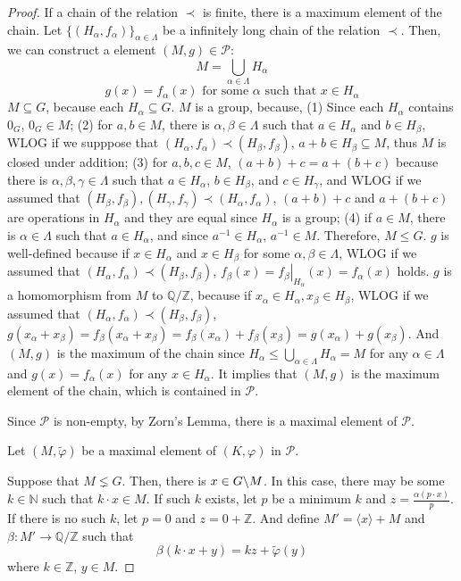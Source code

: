 \documentclass{article}
\newcommand{\bs}{\char`\\}
\newcommand{\bbN}{\mathbb{N}}
\newcommand{\bbQ}{\mathbb{Q}}
\newcommand{\bbZ}{\mathbb{Z}}
\newcommand{\calP}{\mathcal{P}}
\begin{document}
\begin{proof}
If a chain of the relation \(\prec\) is finite, there is a maximum element of the chain.
Let \(\{(H_\alpha, f_\alpha)\}_{\alpha \in \Lambda}\) be a infinitely long chain of the relation \(\prec\).
Then, we can construct a element \((M, g) \in \calP\):
\[M = \bigcup_{\alpha \in \Lambda} H_\alpha\]
\[g(x) = f_\alpha(x) \text{ for some } \alpha \text { such that } x \in H_\alpha\]
\(M \subseteq G\), because each \(H_\alpha \subseteq G\).
\(M\) is a group, because, (1) Since each \(H_\alpha\) contains \(0_G\), \(0_G \in M\); (2) for \(a, b \in M\), there is \(\alpha, \beta \in \Lambda\) such that \(a \in H_\alpha\) and \(b \in H_\beta\), WLOG if we supppose that \((H_\alpha, f_\alpha) \prec (H_\beta, f_\beta)\), \(a + b \in H_\beta \subseteq M\), thus \(M\) is closed under addition; (3) for \(a, b, c \in M\), \((a + b) + c = a + (b + c)\) because there is \(\alpha, \beta, \gamma \in \Lambda\) such that \(a \in H_\alpha\), \(b \in H_\beta\), and \(c \in H_\gamma\), and WLOG if we assumed that \((H_\beta, f_\beta), (H_\gamma, f_\gamma) \prec (H_\alpha, f_\alpha)\), \((a + b) + c\) and \(a + (b + c)\) are operations in \(H_\alpha\) and they are equal since \(H_\alpha\) is a group; (4) if \(a \in M\), there is \(\alpha \in \Lambda\) such that \(a \in H_\alpha\), and since \(a^{-1} \in H_\alpha\), \(a^{-1} \in M\).
Therefore, \(M \le G\).
\(g\) is well-defined because if \(x \in H_\alpha\) and \(x \in H_\beta\) for some \(\alpha, \beta \in \Lambda\), WLOG if we assumed that \((H_\alpha, f_\alpha) \prec (H_\beta, f_\beta)\), \(f_\beta(x) = \left. f_\beta\right|_{H_\alpha}(x) = f_\alpha(x)\) holds.
\(g\) is a homomorphism from \(M\) to \(\bbQ/\bbZ\), because if \(x_\alpha \in H_\alpha, x_\beta \in H_\beta\), WLOG if we assumed that \((H_\alpha, f_\alpha) \prec (H_\beta, f_\beta)\), \(g(x_\alpha + x_\beta) = f_\beta(x_\alpha + x_\beta) = f_\beta(x_\alpha) + f_\beta(x_\beta) = g(x_\alpha) + g(x_\beta)\).
And \((M, g)\) is the maximum of the chain since \(H_\alpha \le \bigcup_{\alpha \in \Lambda} H_\alpha = M\) for any \(\alpha \in \Lambda\) and \(g(x) = f_\alpha(x)\) for any \(x \in H_\alpha\).
It implies that \((M, g)\) is the maximum element of the chain, which is contained in \(\calP\).

Since \(\calP\) is non-empty,
by Zorn's Lemma, there is a maximal element of \(\calP\).
\newline

Let \((M, \tilde\varphi)\) be a maximal element of \((K, \varphi)\) in \(\calP\).

Suppose that \(M \lneq G\).
Then, there is \(x \in G \bs M\).
In this case, there may be some \(k \in \bbN\) such that \(k \cdot x \in M\).
If such \(k\) exists, let \(p\) be a minimum \(k\) and \(z = \frac{\alpha(p \cdot x)}{p}\).
If there is no such \(k\), let \(p = 0\) and \(z = 0 + \bbZ\).
And define \(M' = \langle x \rangle + M\) and \(\beta: M' \to \bbQ / \bbZ\) such that
\[\beta(k \cdot x + y) = kz + \tilde\varphi(y)\]
where \(k \in \bbZ\), \(y \in M\).


\end{proof}
\end{document}
